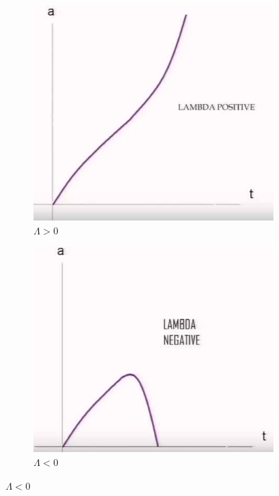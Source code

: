 \documentclass[]{article}
\begin{document}
\begin{figure}[H]
	\caption{Effect of $\Lambda$, the Cosmological Constant}
	\begin{subfigure}[t]{0.45\textwidth}
		\caption{ $\Lambda>0$}\label{fig:wt1ws-lambda-plus}
		\includegraphics[width=\textwidth]{wt1ws-lambda-plus}
	\end{subfigure}
	\begin{subfigure}[t]{0.45\textwidth}
		\caption{ $\Lambda<0$}\label{fig:wt1ws-lambda-minus}
		\includegraphics[width=\textwidth]{wt1ws-lambda-minus}
	\end{subfigure}
\end{figure}
\end{document}
